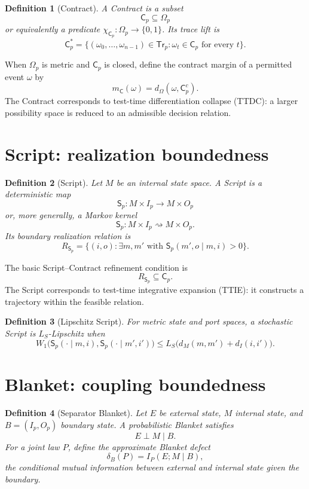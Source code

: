 \documentclass[11pt]{article}
\newtheorem{definition}{Definition}[section]
\newcommand{\Contract}{\mathsf{C}}
\newcommand{\Script}{\mathsf{S}}
\newcommand{\Tr}{\mathsf{Tr}}
\begin{document}
\begin{definition}[Contract]
A Contract is a subset
\[
\Contract_p\subseteq\Omega_p
\]
or equivalently a predicate $\chi_{\Contract_p}:\Omega_p\to\{0,1\}$. Its trace lift is
\[
\Contract_p^*=\{(\omega_0,\ldots,\omega_{n-1})\in\Tr_p:
\omega_t\in\Contract_p\text{ for every }t\}.
\]
\end{definition}

When $\Omega_p$ is metric and $\Contract_p$ is closed, define the contract margin of a permitted event $\omega$ by
\[
m_{\Contract}(\omega)=d_{\Omega}(\omega,\Contract_p^c).
\]
The Contract corresponds to test-time differentiation collapse (TTDC): a larger possibility space is reduced to an admissible decision relation.

\section{Script: realization boundedness}

\begin{definition}[Script]
Let $M$ be an internal state space. A Script is a deterministic map
\[
\Script_p:M\times I_p\to M\times O_p
\]
or, more generally, a Markov kernel
\[
\Script_p:M\times I_p\rightsquigarrow M\times O_p.
\]
Its boundary realization relation is
\[
R_{\Script_p}
=
\{(i,o):\exists m,m'\text{ with }\Script_p(m',o\mid m,i)>0\}.
\]
\end{definition}

The basic Script--Contract refinement condition is
\[
R_{\Script_p}\subseteq\Contract_p.
\]
The Script corresponds to test-time integrative expansion (TTIE): it constructs a trajectory within the feasible relation.

\begin{definition}[Lipschitz Script]
For metric state and port spaces, a stochastic Script is $L_S$-Lipschitz when
\[
W_1\bigl(\Script_p(\cdot\mid m,i),\Script_p(\cdot\mid m',i')\bigr)
\le
L_S\bigl(d_M(m,m')+d_I(i,i')\bigr).
\]
\end{definition}

\section{Blanket: coupling boundedness}

\begin{definition}[Separator Blanket]
Let $E$ be external state, $M$ internal state, and $B=(I_p,O_p)$ boundary state. A probabilistic Blanket satisfies
\[
E\perp M\mid B.
\]
For a joint law $P$, define the approximate Blanket defect
\[
\delta_B(P)=I_P(E;M\mid B),
\]
the conditional mutual information between external and internal state given the boundary.
\end{definition}
\end{document}
